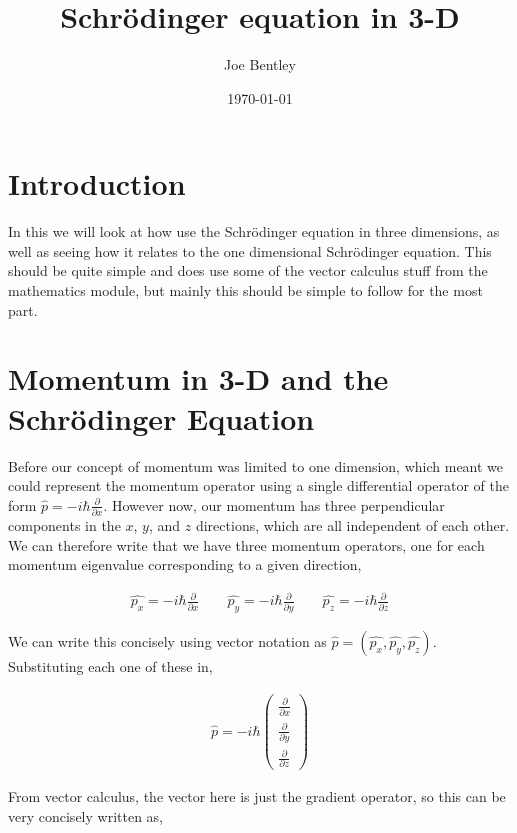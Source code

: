 \documentclass[11pt]{amsart}
\title{Schr\"{o}dinger equation in 3-D}
\author{Joe Bentley}
\date{\today}
\begin{document}
\maketitle

\newpage

\section{Introduction}

In this we will look at how use the Schr\"{o}dinger equation in three dimensions, as well as seeing how it relates to the one dimensional Schr\"{o}dinger equation. This should be quite simple and does use some of the vector calculus stuff from the mathematics module, but mainly this should be simple to follow for the most part.

\section{Momentum in 3-D and the Schr\"{o}dinger Equation}

Before our concept of momentum was limited to one dimension, which meant we could represent the momentum operator using a single differential operator of the form $\hat{p} = -i\hbar\frac{\partial}{\partial x}$. However now, our momentum has three perpendicular components in the $x$, $y$, and $z$ directions, which are all independent of each other. We can therefore write that we have three momentum operators, one for each momentum eigenvalue corresponding to a given direction,

\begin{align*}
  \hat{p_x} = -i\hbar\frac{\partial}{\partial x} \qquad \hat{p_y} = -i\hbar\frac{\partial}{\partial y} \qquad \hat{p_z} = -i\hbar\frac{\partial}{\partial z}
\end{align*}

We can write this concisely using vector notation as $\hat{p} = (\hat{p_x}, \hat{p_y}, \hat{p_z})$. Substituting each one of these in,

\begin{align*}
  \hat{p}=-i\hbar
  \begin{pmatrix}
    \frac{\partial}{\partial x} \\[4pt]
    \frac{\partial}{\partial y} \\[4pt]
    \frac{\partial}{\partial z}
  \end{pmatrix}
\end{align*}

From vector calculus, the vector here is just the gradient operator, so this can be very concisely written as,
\end{document}
